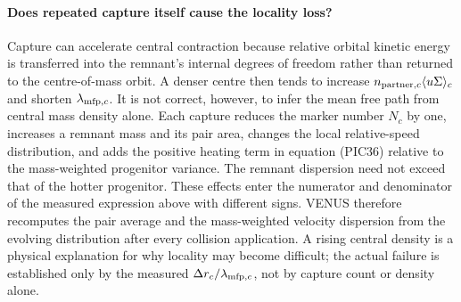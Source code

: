 \paragraph{Does repeated capture itself cause the locality loss?}
Capture can accelerate central contraction because relative orbital kinetic
energy is transferred into the remnant's internal degrees of freedom rather
than returned to the centre-of-mass orbit.  A denser centre then tends to
increase \(n_{{\rm partner},c}\langle u\Sigma\rangle_c\) and shorten
\(\lambda_{{\rm mfp},c}\).  It is not correct, however, to infer the mean free
path from central mass density alone.  Each capture reduces the marker number
\(N_c\) by one, increases a remnant mass and its pair area, changes the local
relative-speed distribution, and adds the positive heating term in equation
(PIC36) relative to the mass-weighted progenitor variance.  The remnant
dispersion need not exceed that of the hotter progenitor.  These effects enter
the numerator and denominator of the measured expression above with different
signs.  VENUS therefore recomputes the pair average and the mass-weighted
velocity dispersion from the evolving distribution after every collision
application.  A rising central density is a physical explanation for why
locality may become difficult; the actual failure is established only by the
measured \(\Delta r_c/\lambda_{{\rm mfp},c}\), not by capture count or density
alone.

